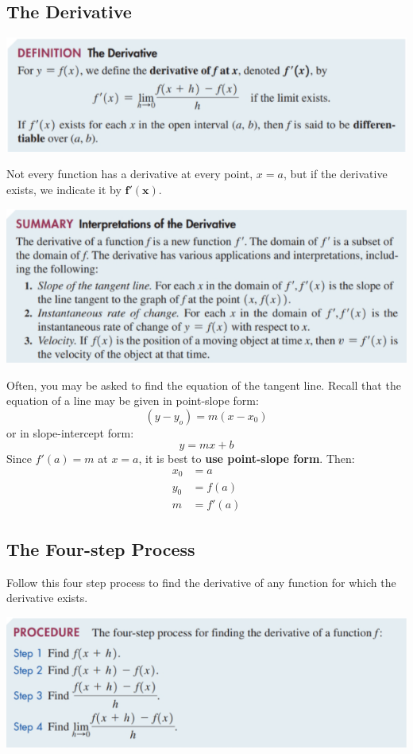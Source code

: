 \documentclass[14pt]{extarticle}
\begin{document}
\subsection*{The Derivative}
\begin{center}
	\includegraphics[width=0.9\linewidth]{9-4-1}
\end{center}
Not every function has a derivative at every point, $x=a$, but if the derivative exists, we indicate it by $\mathbf{f'(x)}$.

\begin{center}
	\includegraphics[width=0.9\linewidth]{9-4-2}
\end{center}
Often, you may be asked to find the equation of the tangent line. Recall that the equation of a line may be given in point-slope form:
$$(y-y_o) = m(x-x_0)$$
or in slope-intercept form:
$$y=mx+b$$
Since $f'(a) = m$ at $x=a$, it is best to \textbf{use point-slope form}. Then:
\begin{align*}
	x_0 &= a \\
	y_0 &= f(a) \\
	m & = f'(a)
\end{align*}

\subsection{The Four-step Process}
Follow this four step process to find the derivative of any function for which the derivative exists.
\begin{center}
	\includegraphics[width=0.9\linewidth]{9-4-3}
\end{center}
\end{document}

